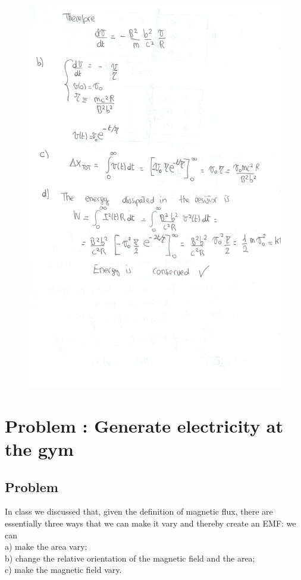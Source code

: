 \documentclass[solutions]{esg8022pset}
\begin{document}
    \begin{figure}[H]
    \centering
    \includegraphics{ps9_2b}
  \end{figure}
\section{Problem \thesection: Generate electricity at the gym}
\subsection{Problem}
In class we discussed that, given the definition of magnetic flux, there are essentially three ways that we can make it vary and thereby create an EMF: we can \\
\noindent a) make the area vary;\\
\noindent b) change the relative orientation of the magnetic field and the area; \\
\noindent c) make the magnetic field vary. \\
\end{document}
